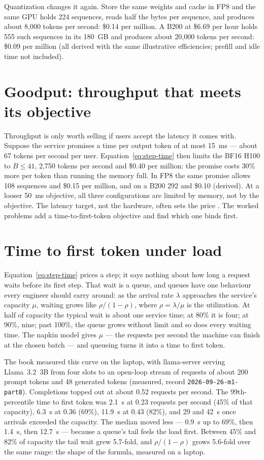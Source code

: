 Quantization changes it again. Store the same weights and cache in FP8 and the
same GPU holds 224 sequences, reads half the bytes per sequence, and produces
about 8,000 tokens per second: \$0.14 per million. A B200 at \$6.69 per hour
holds 555 such sequences in its 180~GB and produces about 20,000 tokens per
second: \$0.09 per million (all derived with the same illustrative
efficiencies; prefill and idle time not included).

\section{Goodput: throughput that meets its objective}

Throughput is only worth selling if users accept the latency it comes with.
Suppose the service promises a time per output token of at most 15~ms --- about
67 tokens per second per user. Equation~\eqref{eq:step-time} then limits the
BF16 H100 to $B\le41$, 2,750 tokens per second and \$0.40 per million: the
promise costs 30\% more per token than running the memory full. In FP8 the same
promise allows 108 sequences and \$0.15 per million, and on a B200 292 and \$0.10
(derived). At a looser 50~ms objective, all three configurations are limited by
memory, not by the objective. The latency target, not the hardware, often sets the price
\cite{zhong2024distserve}. The worked problems add a time-to-first-token
objective and find which one binds first.

\section{Time to first token under load}

Equation~\eqref{eq:step-time} prices a step; it says nothing about how long a
request waits before its first step. That wait is a queue, and queues have one
behaviour every engineer should carry around: as the arrival rate $\lambda$
approaches the service's capacity $\mu$, waiting grows like
$\rho/(1-\rho)$, where $\rho = \lambda/\mu$ is the utilization. At half of
capacity the typical wait is about one service time; at 80\% it is four; at
90\%, nine; past 100\%, the queue grows without limit and so does every waiting
time. The napkin model gives $\mu$ --- the requests per second the machine can
finish at the chosen batch --- and queueing turns it into a time to first token.

The book measured this curve on the laptop, with llama-server serving
Llama~3.2~3B from four slots to an open-loop stream of requests of about 200
prompt tokens and 48 generated tokens (measured, record
\texttt{2026-09-26-m1-part8}). Completions topped out at about 0.52 requests per
second. The 99th-percentile time to first token was 2.1~s at 0.23 requests per
second (45\% of that capacity), 6.3~s at 0.36 (69\%), 11.9~s at 0.43 (82\%), and
29 and 42~s once arrivals exceeded the capacity. The median moved less --- 0.9~s
up to 69\%, then 1.4~s, then 12.7~s --- because a queue's tail feels the load
first. Between 45\% and 82\% of capacity the tail wait grew 5.7-fold, and
$\rho/(1-\rho)$ grows 5.6-fold over the same range: the shape of the formula,
measured on a laptop.

